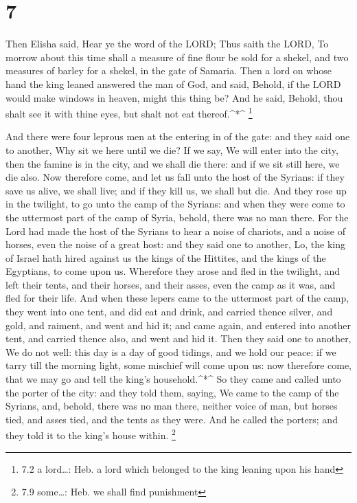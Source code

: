\hypertarget{section-6}{%
\section{7}\label{section-6}}

 Then Elisha said, Hear ye the word of the LORD; Thus saith
the LORD, To morrow about this time shall a measure of fine flour be
sold for a shekel, and two measures of barley for a shekel, in the gate
of Samaria.  Then a lord on whose hand the king leaned
answered the man of God, and said, Behold, if the LORD would make
windows in heaven, might this thing be? And he said, Behold, thou shalt
see it with thine eyes, but shalt not eat thereof.\^{}*\^{} \footnote{7.2
  a lord\ldots: Heb. a lord which belonged to the king leaning upon his
  hand}

 And there were four leprous men at the entering in of the
gate: and they said one to another, Why sit we here until we die?
 If we say, We will enter into the city, then the famine is
in the city, and we shall die there: and if we sit still here, we die
also. Now therefore come, and let us fall unto the host of the Syrians:
if they save us alive, we shall live; and if they kill us, we shall but
die.  And they rose up in the twilight, to go unto the camp
of the Syrians: and when they were come to the uttermost part of the
camp of Syria, behold, there was no man there.  For the Lord
had made the host of the Syrians to hear a noise of chariots, and a
noise of horses, even the noise of a great host: and they said one to
another, Lo, the king of Israel hath hired against us the kings of the
Hittites, and the kings of the Egyptians, to come upon us. 
Wherefore they arose and fled in the twilight, and left their tents, and
their horses, and their asses, even the camp as it was, and fled for
their life.  And when these lepers came to the uttermost
part of the camp, they went into one tent, and did eat and drink, and
carried thence silver, and gold, and raiment, and went and hid it; and
came again, and entered into another tent, and carried thence also, and
went and hid it.  Then they said one to another, We do not
well: this day is a day of good tidings, and we hold our peace: if we
tarry till the morning light, some mischief will come upon us: now
therefore come, that we may go and tell the king's household.\^{}*\^{}
 So they came and called unto the porter of the city: and
they told them, saying, We came to the camp of the Syrians, and, behold,
there was no man there, neither voice of man, but horses tied, and asses
tied, and the tents as they were.  And he called the
porters; and they told it to the king's house within. \footnote{7.9
  some\ldots: Heb. we shall find punishment}

